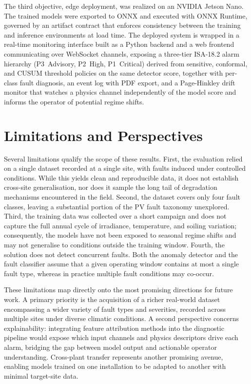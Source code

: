 The third objective, edge deployment, was realized on an NVIDIA Jetson Nano. The trained models were exported to ONNX and executed with ONNX Runtime, governed by an artifact contract that enforces consistency between the training and inference environments at load time. The deployed system is wrapped in a real-time monitoring interface built as a Python backend and a web frontend communicating over WebSocket channels, exposing a three-tier ISA-18.2 alarm hierarchy (P3~Advisory, P2~High, P1~Critical) derived from sensitive, conformal, and CUSUM threshold policies on the same detector score, together with per-class fault diagnosis, an event log with PDF export, and a Page-Hinkley drift monitor that watches a physics channel independently of the model score and informs the operator of potential regime shifts.

\section*{Limitations and Perspectives}

Several limitations qualify the scope of these results. First, the evaluation relied on a single dataset recorded at a single site, with faults induced under controlled conditions. While this yields clean and reproducible data, it does not establish cross-site generalisation, nor does it sample the long tail of degradation mechanisms encountered in the field. Second, the dataset covers only four fault classes, leaving a substantial portion of the PV fault taxonomy unexplored. Third, the training data was collected over a short campaign and does not capture the full annual cycle of irradiance, temperature, and soiling variation; consequently, the models have not been exposed to seasonal regime shifts and may not generalise to conditions outside the training window. Fourth, the solution does not detect concurrent faults. Both the anomaly detector and the fault classifier assume that a given operating window contains at most a single fault type, whereas in practice multiple fault conditions may co-occur.

These limitations map directly onto the most promising directions for future work. A primary priority is the acquisition of a richer real-world dataset encompassing a wider variety of fault types and severities, recorded across multiple sites under diverse climatic conditions. A second perspective concerns explainability: integrating feature attribution methods into the diagnostic pipeline would expose which input channels and physics descriptors drive each alarm, bridging the gap between model output and actionable operator understanding. Cross-plant transfer represents another promising avenue, enabling models trained on one installation to be adapted to another with minimal target-site data. 